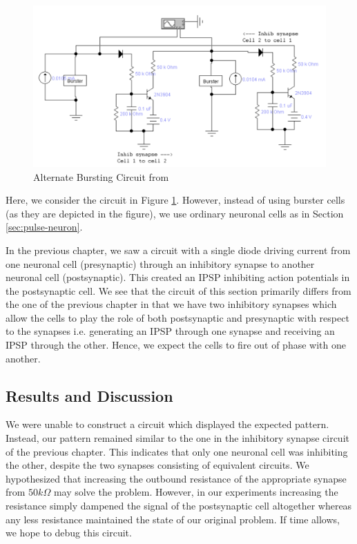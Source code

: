\documentclass[12]{book}
\newcommand\0{\mathbf{0}}
\newcommand\<{\langle}
\renewcommand\>{\rangle}
\begin{document}
\begin{figure}[H]
\label{fig:pattern}
\centering
\includegraphics[width=\textwidth]{pattern_circuit}	
\caption{Alternate Bursting Circuit from \cite{maeda2000pulse}}
\end{figure}

Here, we consider the circuit in Figure \ref{fig:pattern}. However, instead of using burster cells (as they are depicted in the figure), we use ordinary neuronal cells as in Section \ref{sec:pulse-neuron}.

In the previous chapter, we saw a circuit with a single diode driving current from one neuronal cell (presynaptic) through an inhibitory synapse to another neuronal cell (postsynaptic). This created an IPSP inhibiting action potentials in the postsynaptic cell. We see that the circuit of this section primarily differs from the one of the previous chapter in that we have two inhibitory synapses which allow the cells to play the role of both postsynaptic and presynaptic with respect to the synapses i.e. generating an IPSP through one synapse and receiving an IPSP through the other. Hence, we expect the cells to fire out of phase with one another.

\subsection{Results and Discussion}

We were unable to construct a circuit which displayed the expected pattern. Instead, our pattern remained similar to the one in the inhibitory synapse circuit of the previous chapter. This indicates that only one neuronal cell was inhibiting the other, despite the two synapses consisting of equivalent circuits. We hypothesized that increasing the outbound resistance of the appropriate synapse from $50k\Omega$ may solve the problem. However, in our experiments increasing the resistance simply dampened the signal of the postsynaptic cell altogether whereas any less resistance maintained the state of our original problem. If time allows, we hope to debug this circuit.



\nocite{*}
\end{document}

